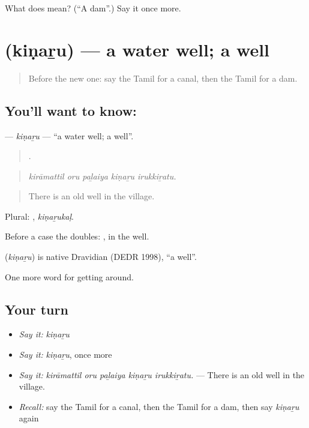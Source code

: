 \begin{tcolorbox}[breakable,colback=teal!4,colframe=teal!35!black,title={Before you move on}]
What does  mean? (\textquotedblleft{}A dam\textquotedblright{}.) Say it once more.
\end{tcolorbox}
\section[\texorpdfstring{\ta{கிணறு} (kiṇaṟu)}{கிணறு (kiṇaṟu)}]{ (kiṇaṟu) — a water well; a well}

\label{lesson:TA-C432-kinaru}



\begin{quote}
Before the new one: say the Tamil for a canal, then the Tamil for a dam.
\end{quote}

\subsection*{You'll want to know: }
\textbf{} — \emph{kiṇaṟu} — \textquotedblleft{}a water well; a well\textquotedblright{}.

\begin{quote}
    .
\end{quote}

\begin{quote}
\emph{kirāmattil oru paḻaiya kiṇaṟu irukkiṟatu.}
\end{quote}

\begin{quote}
There is an old well in the village.
\end{quote}

Plural: , \emph{kiṇaṟukaḷ}.

Before a case the  doubles: , in the well.

\begin{cousinweb}
\textbf{} (\emph{kiṇaṟu}) is native Dravidian (DEDR 1998), \textquotedblleft{}a well\textquotedblright{}.
\end{cousinweb}

\begin{grammarlens}[title={What you've built}]
One more word for getting around.
\end{grammarlens}

\subsection*{Your turn}
\begin{itemize}
\raggedright
  \item \emph{Say it:} \emph{kiṇaṟu}
  \item \emph{Say it:} \emph{kiṇaṟu}, once more
  \item \emph{Say it:} \emph{kirāmattil oru paḻaiya kiṇaṟu irukkiṟatu.} — There is an old well in the village.
  \item \emph{Recall:} say the Tamil for a canal, then the Tamil for a dam, then say \emph{kiṇaṟu} again
\end{itemize}

